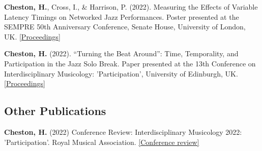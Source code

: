 \documentclass[11pt]{res} %
\begin{document}
\begin{resume}
\begin{hangparas}{.25in}{1}
\textbf{Cheston, H.}, Cross, I., \& Harrison, P. (2022). Measuring the Effects of Variable Latency Timings on Networked Jazz Performances. Poster presented at the SEMPRE 50th Anniversary Conference, Senate House, University of London, UK. \href{https://drive.google.com/file/d/1P72Orm1gqSI4_gOah3Ueb9fdCpriVY_M/view}{[Proceedings]}

\textbf{Cheston, H.} (2022). “Turning the Beat Around”: Time, Temporality, and Participation in the Jazz Solo Break. Paper presented at the 13th Conference on Interdisciplinary Musicology: 'Participation', University of Edinburgh, UK. \href{http://journals.ed.ac.uk/CIM22-Proceedings}{[Proceedings]}
\end{hangparas}

\subsection{Other Publications}
\begin{hangparas}{.25in}{1}
\textbf{Cheston, H.} (2022) Conference Review: Interdisciplinary Musicology 2022: 'Participation'. Royal Musical Association. \href{https://www.rma.ac.uk/2022/06/23/conference-review-interdisciplinary-musicology-2022-participation/}{[Conference review]}
\end{hangparas}

\end{resume} 
\end{document}

